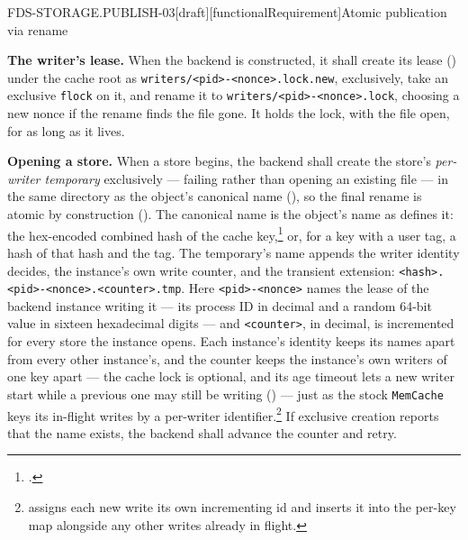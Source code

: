 \begin{requirement}{FDS-STORAGE.PUBLISH-03}[draft][functionalRequirement]{Atomic publication via rename}


  \textbf{The writer's lease.} When the backend is constructed, it shall
  create its lease () under the cache root
  as \texttt{writers/<pid>-<nonce>.lock.new}, exclusively, take an exclusive
  \texttt{flock} on it, and rename it to \texttt{writers/<pid>-<nonce>.lock},
  choosing a new nonce if the rename finds the file gone. It holds the lock,
  with the file open, for as long as it lives.

  \textbf{Opening a store.} When a store begins, the backend shall create the
  store's \emph{per-writer temporary} exclusively --- failing rather than
  opening an existing file --- in the same directory as the object's
  canonical name (), so the final rename is
  atomic by construction (). The
  canonical name is the object's name as 
  defines it: the hex-encoded combined hash of the cache
  key,\footnote{.}
  or, for a key with a user tag, a hash of that hash and the tag. The
  temporary's name appends the writer identity
   decides, the instance's own write
  counter, and the transient extension:
  \texttt{<hash>.<pid>-<nonce>.<counter>.tmp}. Here
  \texttt{<pid>-<nonce>} names the lease of the backend instance writing it
  --- its process ID in decimal and a random 64-bit value in sixteen
  hexadecimal digits --- and \texttt{<counter>}, in decimal, is incremented
  for every store the instance opens. Each instance's identity keeps its
  names apart from every other instance's, and the counter keeps the
  instance's own writers of one key apart --- the cache lock is optional, and
  its age timeout lets a new writer start while a previous one may still be
  writing () --- just as the stock
  \texttt{MemCache} keys its in-flight writes by a per-writer
  identifier.\footnote{
  assigns each new write its own incrementing id and inserts it into the
  per-key map alongside any other writes already in flight.} If exclusive
  creation reports that the name exists, the backend shall advance the
  counter and retry.


\end{requirement}
